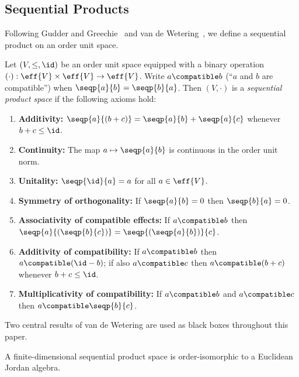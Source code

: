 \documentclass[11pt]{article}
\begin{document}
\subsection{Sequential Products}
\label{sec:sp-axioms}

Following Gudder and Greechie~\cite{GudderGreechie2002} and van de
Wetering~\cite{vandeWetering2019b}, we define a sequential product on
an order unit space.

\begin{definition}
\label{def:sp}
  Let $(V, \leq, \id)$ be an order unit space equipped with a binary
  operation $(\cdot) : \eff{V} \times \eff{V} \to \eff{V}$.  Write
  $a \compatible b$ (``$a$ and $b$ are compatible'') when
  $\seqp{a}{b} = \seqp{b}{a}$.  Then $(V, \cdot)$ is a \emph{sequential
  product space} if the following axioms hold:
  \begin{enumerate}[label=\textup{(S\arabic*)},leftmargin=3em]
    \item\label{ax:S1} \textbf{Additivity:}
      $\seqp{a}{(b+c)} = \seqp{a}{b} + \seqp{a}{c}$ whenever
      $b + c \leq \id$.
    \item\label{ax:S2} \textbf{Continuity:}
      The map $a \mapsto \seqp{a}{b}$ is continuous in the order unit
      norm.
    \item\label{ax:S3} \textbf{Unitality:}
      $\seqp{\id}{a} = a$ for all $a \in \eff{V}$.
    \item\label{ax:S4} \textbf{Symmetry of orthogonality:}
      If $\seqp{a}{b} = 0$ then $\seqp{b}{a} = 0$.
    \item\label{ax:S5} \textbf{Associativity of compatible effects:}
      If $a \compatible b$ then
      $\seqp{a}{(\seqp{b}{c})} = \seqp{(\seqp{a}{b})}{c}$.
    \item\label{ax:S6} \textbf{Additivity of compatibility:}
      If $a \compatible b$ then $a \compatible (\id - b)$; if also
      $a \compatible c$ then $a \compatible (b + c)$ whenever
      $b + c \leq \id$.
    \item\label{ax:S7} \textbf{Multiplicativity of compatibility:}
      If $a \compatible b$ and $a \compatible c$ then
      $a \compatible \seqp{b}{c}$.
  \end{enumerate}
\end{definition}

Two central results of van de Wetering are used as black boxes
throughout this paper.

\begin{theorem}\label{thm:vdw1}
  A finite-dimensional sequential product space is order-isomorphic
  to a Euclidean Jordan algebra.
\end{theorem}
\end{document}
